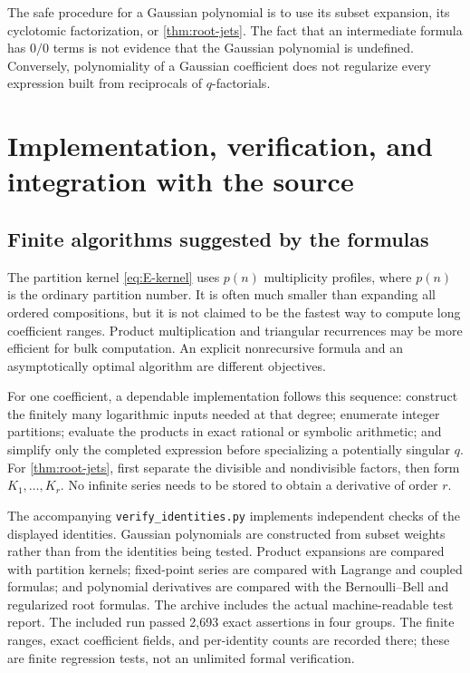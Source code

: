 \documentclass[11pt,a4paper]{article}
\numberwithin{equation}{section}
\theoremstyle{definition}
\theoremstyle{remark}
\begin{document}
The safe procedure for a Gaussian polynomial is to use its subset expansion,
its cyclotomic factorization, or \cref{thm:root-jets}. The fact that an intermediate
formula has $0/0$ terms is not evidence that the Gaussian polynomial is undefined.
Conversely, polynomiality of a Gaussian coefficient does not regularize every
expression built from reciprocals of $q$-factorials.

\section{Implementation, verification, and integration with the source}\label{sec:verification}

\subsection{Finite algorithms suggested by the formulas}
The partition kernel \eqref{eq:E-kernel} uses $p(n)$ multiplicity profiles, where
$p(n)$ is the ordinary partition number. It is often much smaller than expanding
all ordered compositions, but it is not claimed to be the fastest way to compute
long coefficient ranges. Product multiplication and triangular recurrences may
be more efficient for bulk computation. An explicit nonrecursive formula and an
asymptotically optimal algorithm are different objectives.

For one coefficient, a dependable implementation follows this sequence:
construct the finitely many logarithmic inputs needed at that degree; enumerate
integer partitions; evaluate the products in exact rational or symbolic
arithmetic; and simplify only the completed expression before specializing a
potentially singular $q$. For \cref{thm:root-jets}, first separate the divisible
and nondivisible factors, then form $K_1,\ldots,K_r$. No infinite series needs to
be stored to obtain a derivative of order $r$.

The accompanying \texttt{verify\_identities.py} implements independent checks of
the displayed identities. Gaussian polynomials are constructed from subset
weights rather than from the identities being tested. Product expansions are
compared with partition kernels; fixed-point series are compared with Lagrange
and coupled formulas; and polynomial derivatives are compared with the
Bernoulli--Bell and regularized root formulas. The archive includes the actual
machine-readable test report. The included run passed 2,693 exact assertions in four groups. The finite
ranges, exact coefficient fields, and per-identity counts are recorded there;
these are finite regression tests, not an unlimited formal verification.
\end{document}

